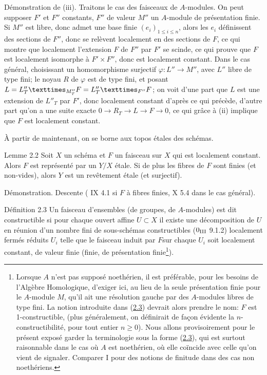 \documentclass[10pt]{../fichiers-configuration-latex/smfart}
\begin{document}
Démonstration de (iii). Traitons le cas des faisceaux de
$A$-modules. On peut supposer $F'$ et $F''$ constants, $F''$ de valeur
$M''$ un $A$-module de présentation finie. Si $M''$ est libre, donc
admet une base finie $(e_i)_{1\leq i\leq n}$, alors les $e_i$
définissent des sections de $F''$, donc se relèvent localement en des
sections de $F$, ce qui montre que localement l'extension $F$ de $F''$
par $F'$ se scinde, ce qui prouve que $F$ est localement isomorphe à
$F'\times F''$, donc est localement constant. Dans le cas général,
choisissant un homomorphisme surjectif $\varphi:L''\rightarrow M''$,
avec $L''$ libre de type fini; le noyau $R$ de $\varphi$ est de type
fini, et posant $L=\fprod{L''_T}{F}{M''_T}=\fprod{L''_T}{F}{F''}$; on
voit d'une part que $L$ est une extension de $L''_T$ par $F'$, donc
localement constant d'après ce qui précède, d'autre part qu'on a une
suite exacte $0\rightarrow R_T\rightarrow L\rightarrow F\rightarrow
0$, ce qui grâce à (ii) implique que $F$ est localement constant.

À partir de maintenant, on se borne aux topos étales des schémas.

\begin{enonce*}{Lemme 2.2}
Soit $X$ un schéma et $F$ un faisceau sur $X$ qui est localement
constant. Alors $F$ est représenté par un $Y/X$ étale. Si de plus les
fibres de $F$ sont finies (\resp et non-vides), alors $Y$ est un
revêtement étale (\resp et surjectif).
\end{enonce*}

Démonstration. Descente ( IX 4.1 si $F$ à fibres finies,  X
5.4 dans le cas général).

\begin{enonce*}{Définition 2.3}
Un faisceau d'ensembles (\resp de groupes, \resp de $A$-modules) est
dit constructible si pour chaque ouvert affine $U\subset X$ il existe
une décomposition de $U$ en réunion d'un nombre fini de sous-schémas
constructibles {\rm (\EGA $0_{{\rm III}}$ 9.1.2)} localement fermés
réduits $U_i$ telle que le faisceau induit par $F$\pageoriginale sur
chaque $U_i$ soit localement constant, de valeur finie (\resp finie,
\resp de présentation finie\footnote[1]{Lorsque $A$ n'est pas
  supposé noethérien, il est préférable, pour les besoins de l'Algèbre
Homologique, d'exiger ici, au lieu de la seule présentation finie pour
le $A$-module $M$, qu'il ait une résolution gauche par des $A$-modules
libres de type fini. La notion introduite dans (\hyperref[IX.def2.3]{2.3}) devrait alors
prendre le nom: $F$ est 1-constructible, (plus généralement, on
définirait de façon évidente la $n$-constructibilité, pour tout
entier $n\geq 0$). Nous allons provisoirement pour le présent exposé
garder la terminologie sous la forme (\hyperref[IX.def2.3]{2.3}), qui est surtout
raisonnable dans le cas où $A$ est noethérien, où elle coïncide avec
celle qu'on vient de signaler. Comparer  I pour des notions de
finitude dans des cas non noethériens.}).
\end{enonce*}
\end{document}

